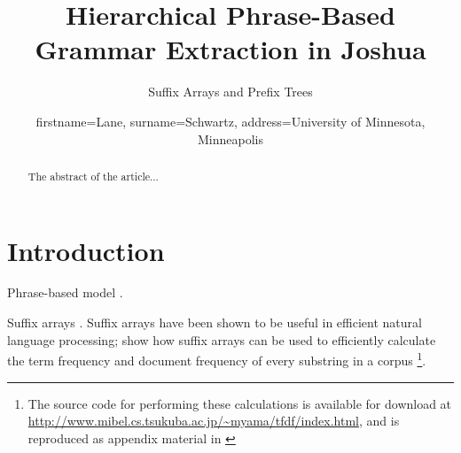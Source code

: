 \documentclass{pbml}
\newcommand{\newcite}{\namecite}
\begin{document}
% 

\title{Hierarchical Phrase-Based Grammar Extraction in Joshua}


\subtitle{Suffix Arrays and Prefix Trees}


\author{firstname=Lane, surname=Schwartz,
       address={University of Minnesota, Minneapolis}}


% 



\maketitle


% 

\begin{abstract}
The abstract of the article...
\end{abstract}



\section{Introduction}

Phrase-based model \cite{Koehn2003,Marcu2002,Och2004,Och1999}.

Suffix arrays  \cite{Manber1990}. Suffix arrays have been shown to be useful in efficient natural language processing; \newcite{Yamamoto2001} show how suffix arrays can be used to efficiently calculate the term frequency and document frequency of every substring in a corpus \footnote{The source code for performing these calculations is available for download at \url{http://www.mibel.cs.tsukuba.ac.jp/~myama/tfdf/index.html}, and is reproduced as appendix material in \cite{Yamamoto2001}}.
\end{document}
